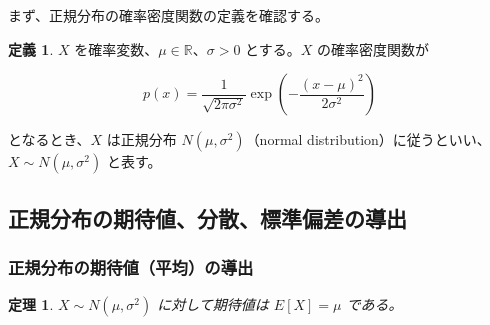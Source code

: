\documentclass[
  11pt,
  a4paper,
]{extarticle}
\numberwithin{equation}{section}
\theoremstyle{plain}
\newtheorem*{thm*}{定理}
\theoremstyle{definition}
\newtheorem*{dfn*}{定義}
\begin{document}
まず、正規分布の確率密度関数の定義を確認する。

\begin{dfn*}

$X$ を確率変数、$\mu \in \mathbb{R}$、$\sigma > 0$ とする。$X$ の確率密度関数が

$$
p(x) = \frac{1}{\sqrt{2\pi \sigma^2}} \exp\left(-\frac{(x-\mu)^2}{2\sigma^2}\right)
$$

となるとき、$X$ は正規分布 $N(\mu, \sigma^2)$（normal distribution）に従うといい、$X \sim N(\mu, \sigma^2)$ と表す。

\end{dfn*}

\newpage

\subsection{正規分布の期待値、分散、標準偏差の導出}\label{ux6b63ux898fux5206ux5e03ux306eux671fux5f85ux5024ux5206ux6563ux6a19ux6e96ux504fux5deeux306eux5c0eux51fa}

\subsubsection{正規分布の期待値（平均）の導出}\label{ux6b63ux898fux5206ux5e03ux306eux671fux5f85ux5024ux5e73ux5747ux306eux5c0eux51fa}

\begin{thm*}

$X \sim N(\mu, \sigma^2)$ に対して期待値は $E[X] = \mu$ である。

\end{thm*}
\end{document}
